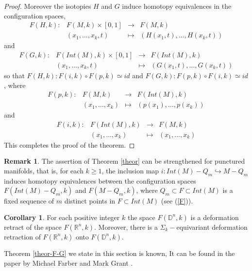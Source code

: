 \documentclass{amsart}
\theoremstyle{definition}
\newtheorem{rem}[thm]{Remark}
\newtheorem{cor}[thm]{Corollary}
\numberwithin{equation}{section}
\begin{document}
\begin{proof}
  Moreover the isotopies $H$ and $G$ induce homotopy equivalences in the configuration spaces,
  \[ \begin{array}{rccl}
 F(H,k):&F(M,k)\times [0,1]&\longrightarrow & F(M,k)\\&(x_1,\ldots,x_k,t)&\mapsto
 &(H(x_1,t),\ldots,H(x_k,t))
                           \end{array} \]
 and \[ \begin{array}{rccl}
 F(G,k):&F(Int(M),k)\times [0,1]&\longrightarrow & F(Int(M),k)\\&(x_1,\ldots,x_k,t)&\mapsto
 &(G(x_1,t),\ldots,G(x_k,t))
                           \end{array} \] so that $F(H,k):F(i,k)\circ F(p,k)\simeq id$ and $F(G,k):F(p,k)\circ F(i,k)\simeq id$, where  \[ \begin{array}{rccl}
 F(p,k):&F(M,k)&\longrightarrow & F(Int(M),k)\\&(x_1,\ldots,x_k)&\mapsto
 &(p(x_1),\ldots,p(x_k))
                           \end{array} \]
 and \[ \begin{array}{rccl}
 F(i,k):&F(Int(M),k)&\longrightarrow & F(M,k)\\&(x_1,\ldots,x_k)&\mapsto
 &(x_1,\ldots,x_k)
                           \end{array} \] This completes the proof of the theorem.
  
\end{proof}

\begin{rem}\label{rem-puctured}
The assertion of Theorem \ref{theor} can be strengthened for punctured manifolds, that is,  for each $k\geq 1$, the inclusion map $i:Int(M)-Q_m\hookrightarrow M-Q_m$ induces homotopy equivalences between the configuration spaces $F(Int(M)-Q_m,k)$ and $F(M-Q_m,k)$, where $Q_m\subset F\subset Int(M)$ is a fixed sequence of $m$ distinct points in $F\subset Int(M)$ (see (\ref{F})).
\end{rem}
 
\begin{cor}\label{coro}
For each positive integer $k$ the space $F(\mathbb{D}^n,k)$ is a deformation retract of the space $F(\mathbb{R}^n,k)$. Moreover, there is a $\Sigma_k-$equivariant deformation retraction of $F(\mathbb{R}^n,k)$ onto $F(\mathbb{D}^n,k)$.
\end{cor}

Theorem \ref{theor-F-G} we state in this section is known, It can be found in the paper by Michael Farber and Mark Grant \cite{farber2009topological}. 
\end{document}
